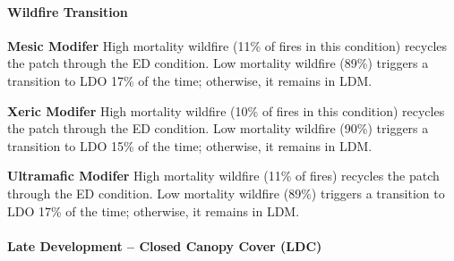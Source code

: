\paragraph{Wildfire Transition}
\begin{adjustwidth}{2cm}{}
\textbf{Mesic Modifer } High mortality wildfire (11\% of fires in this condition) recycles the patch through the ED condition. Low mortality wildfire (89\%) triggers a transition to LDO 17\% of the time; otherwise, it remains in LDM.

\medskip
\noindent \textbf{Xeric Modifer} High mortality wildfire (10\% of fires in this condition) recycles the patch through the ED condition. Low mortality wildfire (90\%) triggers a transition to LDO 15\% of the time; otherwise, it remains in LDM.

\medskip
\noindent \textbf{Ultramafic Modifer}  High mortality wildfire (11\% of fires) recycles the patch through the ED condition. Low mortality wildfire (89\%) triggers a transition to LDO 17\% of the time; otherwise, it remains in LDM.

\end{adjustwidth}
\noindent\hrulefill

\paragraph{Late Development – Closed Canopy Cover (LDC)}

